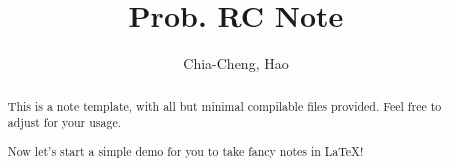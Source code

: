 \documentclass[a4paper]{report}
\author{Chia-Cheng, Hao}
\title{Prob. RC Note}
\begin{document}
\maketitle

\begin{abstract}
	This is a note template, with all but minimal compilable files provided. Feel free to adjust for your usage.

	Now let's start a simple demo for you to take fancy notes in \LaTeX!
\end{abstract}

\newpage

\tableofcontents

\setcounter{chapter}{-1}

\newpage
\appendix
\appendixpage



\newpage
\printbibliography
\end{document}

